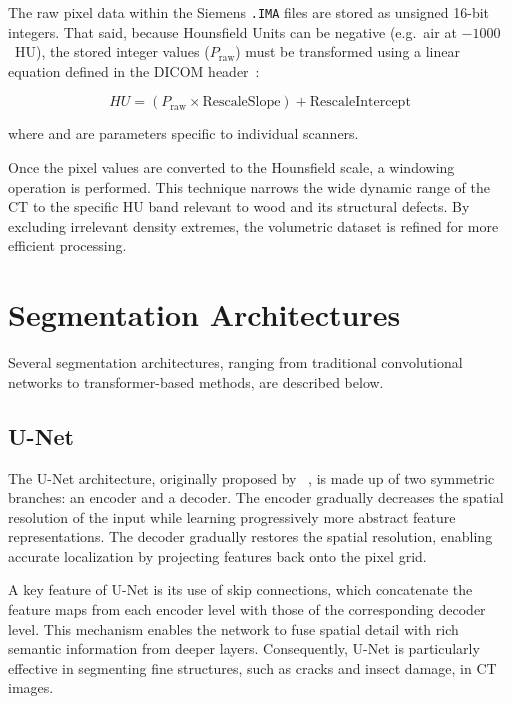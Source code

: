 The raw pixel data within the Siemens \texttt{.IMA} files are stored as
unsigned 16-bit integers. That said, because Hounsfield Units can be negative
(e.g.\ air at $-1000$~HU), the stored integer values ($P_{\text{raw}}$) must
be transformed using a linear equation defined in the DICOM header~\cite{dicom_standard}:

\begin{equation}
    HU = (P_{\text{raw}} \times \text{RescaleSlope}) + \text{RescaleIntercept}
    \label{eq:dicom_conversion}
\end{equation}

\noindent where  and  are parameters specific to individual scanners.

Once the pixel values are converted to the Hounsfield scale, a windowing operation is performed. This technique narrows the wide dynamic range of the CT to the specific HU band relevant to wood and its structural defects. By excluding irrelevant density extremes, the volumetric dataset is refined for more efficient processing.~\cite{dicom_standard}


\section{Segmentation Architectures}
Several segmentation architectures, ranging from traditional convolutional networks to transformer-based methods, are described below.

\subsection{U-Net}

The U-Net architecture, originally proposed by ~\cite{ronneberger2015unet}, is made up of two symmetric branches: an encoder and a decoder. The
encoder gradually decreases the spatial resolution of the input while learning
progressively more abstract feature representations. The decoder gradually
restores the spatial resolution, enabling accurate localization by projecting features back onto the pixel grid.

A key feature of U-Net is its use of skip connections, which
concatenate the feature maps from each encoder level with those of the
corresponding decoder level. This mechanism enables the network to fuse
spatial detail with rich semantic information from deeper
layers. Consequently, U-Net is particularly effective in segmenting fine
structures, such as cracks and insect damage, in CT images.

